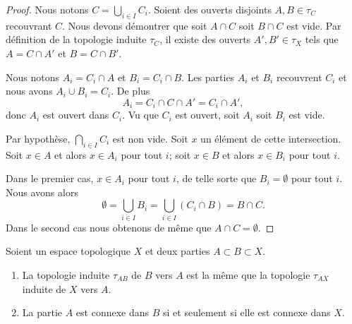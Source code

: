 \begin{proof}
	Nous notons \( C=\bigcup_{i\in I}C_i\). Soient des ouverts disjoints \( A,B\in \tau_C\) recouvrant \( C\). Nous devons démontrer que soit \( A\cap C\) soit \( B\cap C\) est vide. Par définition de la topologie induite \( \tau_C\), il existe des ouverts \( A',B'\in\tau_X\) tels que \( A=C\cap A'\) et \( B=C\cap B'\).

	Nous notons \( A_i=C_i\cap A\) et \( B_i=C_i\cap B\). Les parties \( A_i\) et \( B_i\) recouvrent \( C_i\) et nous avons \( A_i\cup B_i=C_i\). De plus
	\begin{equation}
		A_i=C_i\cap C\cap A'=C_i\cap A',
	\end{equation}
	donc \( A_i\) est ouvert dans \( C_i\). Vu que \( C_i\) est ouvert, soit \( A_i\) soit \( B_i\) est vide.

	Par hypothèse, \( \bigcap_{i\in I}C_i\) est non vide. Soit \( x\) un élément de cette intersection. Soit \( x\in A\) et alors \( x\in A_i\) pour tout \( i\); soit \( x\in B\) et alors \( x\in B_i\) pour tout \( i\).

	Dans le premier cas, \( x\in A_i\) pour tout \( i\), de telle sorte que \( B_i=\emptyset\) pour tout \( i\). Nous avons alors
	\begin{equation}
		\emptyset=\bigcup_{i\in I}B_i=\bigcup_{i\in I}(C_i\cap B)=B\cap C.
	\end{equation}
	Dans le second cas nous obtenons de même que \( A\cap C=\emptyset\).
\end{proof}



\begin{proposition}	\label{PROPooEKIOooERjTDx}
	Soient un espace topologique \( X\) et deux parties \( A\subset B\subset X\).
	\begin{enumerate}
		\item	\label{ITEMooDOWIooAsTJyV}
		      La topologie induite \( \tau_{AB}\) de \( B\) vers \( A\) est la même que la topologie \( \tau_{AX}\) induite de \( X\) vers \( A\).
		\item		\label{ITEMooXYGZooGUknmv}
		      La partie \( A\) est connexe dans \( B\) si et seulement si elle est connexe dans \( X\).
	\end{enumerate}
\end{proposition}

